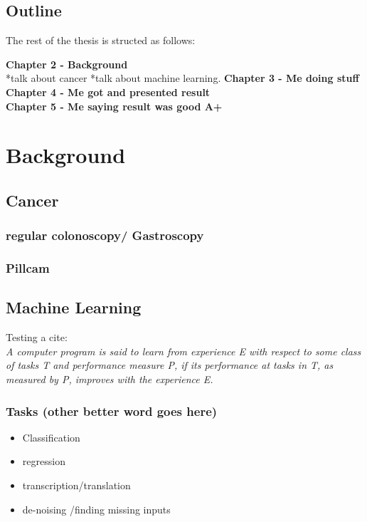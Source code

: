 \documentclass[a4paper,english]{ifimaster}
\begin{document}
	
		

	\section{Outline}
	The rest of the thesis is structed as follows:
	
	\textbf{Chapter 2 - Background}\\
	*talk about cancer
	*talk about machine learning.
	\textbf{Chapter 3 - Me doing stuff}\\
	\textbf{Chapter 4 - Me got and presented result}\\
	\textbf{Chapter 5 - Me saying result was good A+}\\
	
		
\chapter{Background}
	\section{Cancer}
	  \subsection{regular colonoscopy/ Gastroscopy}
	  \subsection{Pillcam}
	  
	  
	\section{Machine Learning}



	Testing a cite:\\

	\textit{ A computer program is said to learn from experience E with respect to 
	some class of tasks T and performance measure P, if its performance at
	tasks in T, as measured by P, improves with the experience E. } 
	\cite{MitchellTomM1997Ml}
	  \subsection{Tasks (other better word goes here)}
\label{chap:Tasks}
\begin{itemize}
 \item Classification
 \item regression 
 \item transcription/translation
 \item de-noising /finding missing inputs
\end{itemize}
\end{document}
